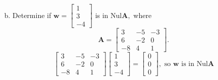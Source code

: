 \begin{enumerate}[(a)]
\begin{enumerate}[(i)]
$$        $$
    \end{enumerate}
    \item
    Determine if $\mathbf{w}=\left[\begin{array}{r}1 \\ 3 \\ -4\end{array}\right]$ is in $\mathrm{Nul} \mathbf{A},$ where
    \[
    \mathbf{A}=\left[\begin{array}{rrr}
    3 & -5 & -3 \\
    6 & -2 & 0 \\
    -8 & 4 & 1
    \end{array}\right].
    \]
    $$\left[\begin{array}{rrr}
    3 & -5 & -3 \\
    6 & -2 & 0 \\
    -8 & 4 & 1
    \end{array}\right]\left[\begin{array}{r}
    1 \\
    3 \\
    -4
    \end{array}\right]=\left[\begin{array}{l}
    0 \\
    0 \\
    0
    \end{array}\right], \text { so } \mathbf{w} \text { is in } \mathrm{Nul} \mathbf{A}$$
\end{enumerate}